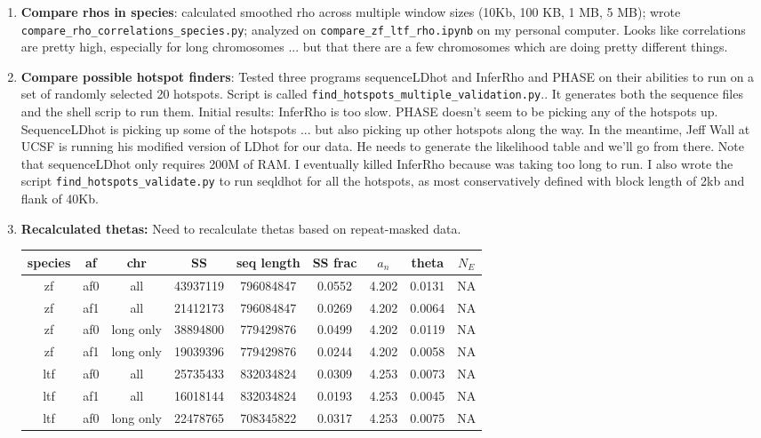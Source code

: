 \documentclass[idxtotoc,hyperref,openany,oneside]{labbook} %
\begin{document}
\begin{enumerate}
\item \textbf{Compare rhos in species}: calculated smoothed rho across multiple window sizes (10Kb, 100 KB, 1 MB, 5 MB); wrote \verb+compare_rho_correlations_species.py+; analyzed on \verb+compare_zf_ltf_rho.ipynb+ on my personal computer. Looks like correlations are pretty high, especially for long chromosomes ... but that there are a few chromosomes which are doing pretty different things.
\item \textbf{Compare possible hotspot finders}: Tested three programs sequenceLDhot and InferRho and PHASE on their abilities to run on a set of randomly selected 20 hotspots. Script is called \verb+find_hotspots_multiple_validation.py+.. It generates both the sequence files and the shell scrip to run them. Initial results: InferRho is too slow. PHASE doesn't seem to be picking any of the hotspots up. SequenceLDhot is picking up some of the hotspots ... but also picking up other hotspots along the way. In the meantime, Jeff Wall at UCSF is running his modified version of LDhot for our data. He needs to generate the likelihood table and we'll go from there. Note that sequenceLDhot only requires 200M of RAM. I eventually killed InferRho because was taking too long to run. I also wrote the script \verb+find_hotspots_validate.py+ to run seqldhot for all the hotspots, as most conservatively defined with block length of 2kb and flank of 40Kb.
\item \textbf{Recalculated thetas:} Need to recalculate thetas based on repeat-masked data.
\begin{table}[h]
\begin{tabular}{ccccccccc}
\hline
species & af & chr & SS & seq length & SS frac & $a_{n}$ & theta & $N_{E}$ \\
\hline
zf & af0 & all & 43937119 & 796084847 & 0.0552 & 4.202 & 0.0131 & NA \\
zf & af1 & all & 21412173 & 796084847 & 0.0269 & 4.202 & 0.0064 & NA \\
zf & af0 & long only & 38894800 & 779429876 & 0.0499 & 4.202 & 0.0119 & NA \\
zf & af1 & long only & 19039396 & 779429876 & 0.0244 & 4.202 & 0.0058 & NA \\
ltf & af0 & all & 25735433 & 832034824 & 0.0309 & 4.253 & 0.0073 & NA \\
ltf & af1 & all & 16018144 & 832034824 & 0.0193 & 4.253 & 0.0045 & NA \\
ltf & af0 & long only & 22478765 & 708345822 & 0.0317 & 4.253 & 0.0075 & NA \\

\end{tabular}
\end{table}
\end{enumerate}
\end{document}
